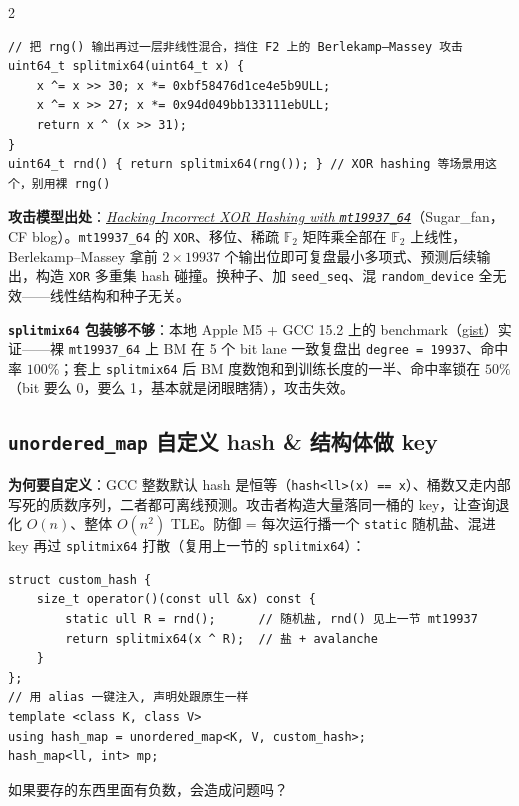 \begin{multicols*}{2}
\begin{verbatim}
// 把 rng() 输出再过一层非线性混合，挡住 F2 上的 Berlekamp–Massey 攻击
uint64_t splitmix64(uint64_t x) {
	x ^= x >> 30; x *= 0xbf58476d1ce4e5b9ULL;
	x ^= x >> 27; x *= 0x94d049bb133111ebULL;
	return x ^ (x >> 31);
}
uint64_t rnd() { return splitmix64(rng()); } // XOR hashing 等场景用这个，别用裸 rng()
		\end{verbatim}

		\textbf{攻击模型出处}：\href{https://codeforces.com/blog/entry/153335}{\textit{Hacking Incorrect XOR Hashing with \texttt{mt19937\_64}}}（Sugar\_fan，CF blog）。\texttt{mt19937\_64} 的 \texttt{XOR}、移位、稀疏 $\mathbb{F}_2$ 矩阵乘全部在 $\mathbb{F}_2$ 上线性，Berlekamp–Massey 拿前 $2 \times 19937$ 个输出位即可复盘最小多项式、预测后续输出，构造 \texttt{XOR} 多重集 hash 碰撞。换种子、加 \texttt{seed\_seq}、混 \texttt{random\_device} 全无效——线性结构和种子无关。

		\textbf{\texttt{splitmix64} 包装够不够}：本地 Apple M5 + GCC 15.2 上的 benchmark（\href{https://gist.github.com/znzryb/a867eefeb8575e1c5f599a5044273614}{gist}）实证——裸 \texttt{mt19937\_64} 上 BM 在 5 个 bit lane 一致复盘出 \texttt{degree = 19937}、命中率 $100\%$；套上 \texttt{splitmix64} 后 BM 度数饱和到训练长度的一半、命中率锁在 $50\%$（bit 要么 0，要么 1，基本就是闭眼瞎猜），攻击失效。

		\subsection{\texttt{unordered\_map} 自定义 hash \& 结构体做 key}

		\textbf{为何要自定义}：GCC 整数默认 hash 是恒等（\texttt{hash<ll>(x) == x}）、桶数又走内部写死的质数序列，二者都可离线预测。攻击者构造大量落同一桶的 key，让查询退化 $O(n)$、整体 $O(n^2)$ TLE。防御 = 每次运行播一个 \texttt{static} 随机盐、混进 key 再过 \texttt{splitmix64} 打散（复用上一节的 \texttt{splitmix64}）：

		\begin{verbatim}
struct custom_hash {
	size_t operator()(const ull &x) const {
		static ull R = rnd();      // 随机盐, rnd() 见上一节 mt19937
		return splitmix64(x ^ R);  // 盐 + avalanche
	}
};
// 用 alias 一键注入, 声明处跟原生一样
template <class K, class V>
using hash_map = unordered_map<K, V, custom_hash>;
hash_map<ll, int> mp;
		\end{verbatim}

		\begin{me}
如果要存的东西里面有负数，会造成问题吗？
		\end{me}


\end{multicols*}
